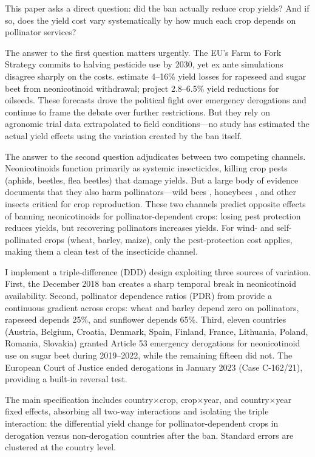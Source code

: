 \documentclass[12pt]{article}
\begin{document}
This paper asks a direct question: did the ban actually reduce crop yields? And if so, does the yield cost vary systematically by how much each crop depends on pollinator services?

The answer to the first question matters urgently. The EU's Farm to Fork Strategy commits to halving pesticide use by 2030, yet ex ante simulations disagree sharply on the costs. \citet{bocker2016european} estimate 4--16\% yield losses for rapeseed and sugar beet from neonicotinoid withdrawal; \citet{kathage2018neonicotinoid} project 2.8--6.5\% yield reductions for oilseeds. These forecasts drove the political fight over emergency derogations and continue to frame the debate over further restrictions. But they rely on agronomic trial data extrapolated to field conditions---no study has estimated the actual yield effects using the variation created by the ban itself.

The answer to the second question adjudicates between two competing channels. Neonicotinoids function primarily as systemic insecticides, killing crop pests (aphids, beetles, flea beetles) that damage yields. But a large body of evidence documents that they also harm pollinators---wild bees \citep{woodcock2017country,rundlof2015seed}, honeybees \citep{tsvetkov2017chronic}, and other insects critical for crop reproduction. These two channels predict opposite effects of banning neonicotinoids for pollinator-dependent crops: losing pest protection reduces yields, but recovering pollinators increases yields. For wind- and self-pollinated crops (wheat, barley, maize), only the pest-protection cost applies, making them a clean test of the insecticide channel.

I implement a triple-difference (DDD) design exploiting three sources of variation. First, the December 2018 ban creates a sharp temporal break in neonicotinoid availability. Second, pollinator dependence ratios (PDR) from \citet{klein2007importance} provide a continuous gradient across crops: wheat and barley depend zero on pollinators, rapeseed depends 25\%, and sunflower depends 65\%. Third, eleven countries (Austria, Belgium, Croatia, Denmark, Spain, Finland, France, Lithuania, Poland, Romania, Slovakia) granted Article 53 emergency derogations for neonicotinoid use on sugar beet during 2019--2022, while the remaining fifteen did not. The European Court of Justice ended derogations in January 2023 (Case C-162/21), providing a built-in reversal test.

The main specification includes country$\times$crop, crop$\times$year, and country$\times$year fixed effects, absorbing all two-way interactions and isolating the triple interaction: the differential yield change for pollinator-dependent crops in derogation versus non-derogation countries after the ban. Standard errors are clustered at the country level.
\end{document}
